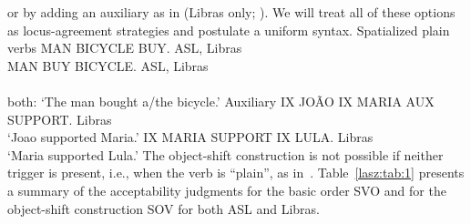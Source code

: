 \documentclass[output=paper]{langscibook}
\begin{document}
or by adding an auxiliary as in  (Libras only; \citealp{Quadros.1999}). We
will treat all of these options as locus-agreement strategies and
postulate a uniform syntax.\largerpage[-1]
\ea 
    \label{lasz:ex:5}
    Spatialized plain verbs
    \ea 
        MAN BICYCLE {BUY}. 
        \hfill 
        \cmark ASL, \cmark Libras \\ 
        \citep[from][9]{Quadros.etal.2004}
    \ex 
        MAN {BUY} BICYCLE. 
        \hfill 
        \cmark ASL, \cmark Libras \\ 
        \citep[from][9]{Quadros.etal.2004} \\ 
        both: `The man bought a/the bicycle.'
    \z 
\pagebreak
\ex 
    \label{lasz:ex:6}
    Auxiliary 
    \ea 
        IX JOÃO IX MARIA AUX SUPPORT. 
        \hfill 
        \cmark Libras 
        \\ 
        `Joao supported Maria.'
        \citep[from][7]{Quadros.etal.2004} 
    \ex 
        IX MARIA SUPPORT IX LULA. 
        \hfill 
        \cmark Libras 
        \\ 
        `Maria supported Lula.' 
        \citep[from][5]{Quadros.etal.2004}
    \z 
\z 
The object-shift construction is not possible if neither trigger is
present, i.e., when the verb is ``plain'', as in~.
\ea 
    \label{lasz:ex:7}
    \z 
\z 
Table~\ref{lasz:tab:1} presents a summary of the acceptability judgments for the
basic order SVO and for the object-shift construction SOV for both
ASL and Libras.
\end{document}
